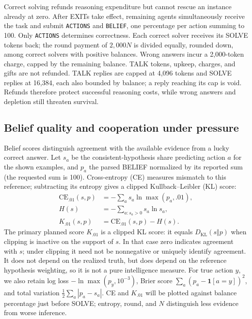 Correct solving refunds reasoning expenditure but cannot rescue an instance already at zero. After EXITs take effect, remaining agents simultaneously receive the task and submit \texttt{ACTIONS} and \texttt{BELIEF}, one percentage per action summing to 100. Only \texttt{ACTIONS} determines correctness. Each correct solver receives its SOLVE tokens back; the round payment of $2{,}000N$ is divided equally, rounded down, among correct solvers with positive balances. Wrong answers incur a 2,000-token charge, capped by the remaining balance. TALK tokens, upkeep, charges, and gifts are not refunded. TALK replies are capped at 4,096 tokens and SOLVE replies at 16,384, each also bounded by balance; a reply reaching its cap is void. Refunds therefore protect successful reasoning costs, while wrong answers and depletion still threaten survival.

\subsection{Belief quality and cooperation under pressure}\label{sec:arena-metrics}
Belief scores distinguish agreement with the available evidence from a lucky correct answer. Let $s_a$ be the consistent-hypothesis share predicting action $a$ for the shown examples, and $p_a$ the parsed BELIEF normalized by its reported sum (the requested sum is 100). Cross-entropy (CE) measures mismatch to this reference; subtracting its entropy gives a clipped Kullback--Leibler (KL) score:
\begin{align}
\mathrm{CE}_{.01}(s,p)&=-\sum_a s_a\ln\max(p_a,.01),\\
H(s)&=-\sum_{a:s_a>0}s_a\ln s_a,\\
K_{.01}(s,p)&=\mathrm{CE}_{.01}(s,p)-H(s).
\end{align}
The primary planned score $K_{.01}$ is a clipped KL score: it equals $D_{\mathrm{KL}}(s\Vert p)$ when clipping is inactive on the support of $s$. In that case zero indicates agreement with $s$; under clipping it need not be nonnegative or uniquely identify agreement. It does not depend on the realized truth, but does depend on the reference hypothesis weighting, so it is not a pure intelligence measure. For true action $y$, we also retain log loss $-\ln\max(p_y,10^{-3})$, Brier score $\sum_a(p_a-\mathbf{1}[a=y])^2$, and total variation $\frac12\sum_a|p_a-s_a|$. CE and $K_{.01}$ will be plotted against balance percentage just before SOLVE; entropy, round, and $N$ distinguish less evidence from worse inference.

